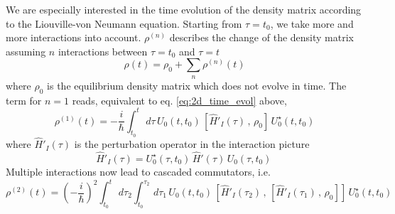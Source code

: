 %
%
%

We are especially interested in the time evolution of the density matrix according to the Liouville-von Neumann equation. Starting from $\tau = t_0$, we take more and more interactions into account. $\rho^{(n)}$ describes the change of the density matrix assuming $n$ interactions between $\tau = t_0$ and $\tau = t$
\begin{equation}
\rho(t) = \rho_0  + \sum_n  \rho^{(n)} (t)
\end{equation}
where $\rho_0$ is the equilibrium density matrix which does not evolve in time.
The term for $n=1$ reads, equivalent to eq.  \ref{eq:2d_time_evol}  above,
\begin{equation}
 \rho^{(1)} (t) = - \frac{i}{\hbar} \int_{t_0}^t \, d\tau \, U_0(t, t_0) \, \left[ \hat{H}'_I(\tau) \, , \, \rho_0 \right] \, U_0^\star (t, t_0)
\end{equation}
where $\hat{H}'_I(\tau) $ is the perturbation operator in the interaction picture
\begin{equation}
\hat{H}'_I(\tau) =  U_0^\star (\tau , t_0) \, \hat{H}'(\tau) \, U_0 (\tau , t_0) \,
\end{equation}
 Multiple interactions now lead to cascaded commutators, i.e.
\begin{equation}
 \rho^{(2)} (t) = \left(- \frac{i}{\hbar}\right)^2   \int_{t_0}^t \, d\tau_2   \int_{t_0}^{\tau_2} \, d\tau_1 \, U_0(t, t_0) \, \left[ \hat{H}'_I(\tau_2) \, , \, \left[ \hat{H}'_I(\tau_1) \, , \, \rho_0 \right] \right] \, U_0^\star (t, t_0)
\end{equation}

